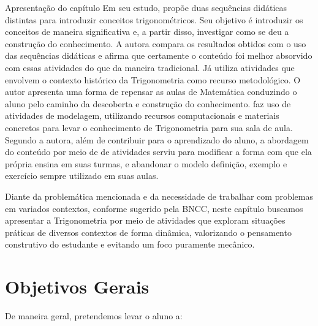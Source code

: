 \begin{apresentacao}{Apresentação do capítulo}
Em seu estudo, \citeauthor{costa1997} propõe duas sequências didáticas distintas para introduzir conceitos trigonométricos. 
%
Seu objetivo é introduzir os conceitos de maneira significativa e, a partir disso, investigar como se deu a construção do conhecimento. 
%
A autora compara os resultados obtidos com o uso das sequências didáticas e afirma que certamente o conteúdo foi melhor absorvido com essas atividades do que da maneira tradicional. 
%
Já \citeauthor{mendes2001} utiliza atividades que envolvem o contexto histórico da Trigonometria como recurso metodológico.
%
O autor apresenta uma forma de repensar as aulas de Matemática conduzindo o aluno pelo caminho da descoberta e construção do conhecimento.
%
\citeauthor{silva2011} faz uso de atividades de modelagem, utilizando recursos computacionais e materiais concretos para levar o conhecimento de Trigonometria para sua sala de aula. 
%
Segundo a autora, além de contribuir para o aprendizado do aluno, a abordagem do conteúdo por meio de de atividades serviu para modificar a forma com que ela própria ensina em suas turmas, e abandonar o modelo definição, exemplo e exercício sempre utilizado em suas aulas.


Diante da problemática mencionada e da necessidade de trabalhar com problemas em variados contextos, conforme sugerido pela BNCC, neste capítulo buscamos apresentar a Trigonometria por meio de atividades que exploram situações práticas de diversos contextos de forma dinâmica, valorizando o pensamento construtivo do estudante e evitando um foco puramente mecânico. 


\section*{Objetivos Gerais}

De maneira geral, pretendemos levar o aluno a:


\end{apresentacao}
